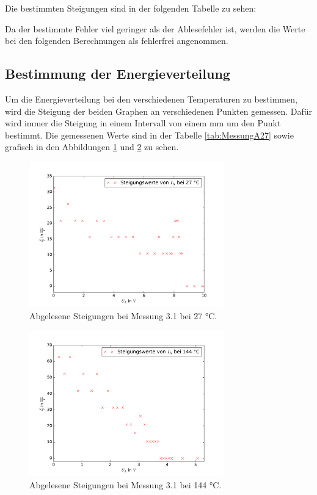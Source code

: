 

Die bestimmten Steigungen sind in der folgenden Tabelle zu sehen:



Da der bestimmte Fehler viel geringer als der Ablesefehler ist, werden die Werte
bei den folgenden Berechnungen als fehlerfrei angenommen.


\subsection{Bestimmung der Energieverteilung}

Um die Energieverteilung bei den verschiedenen Temperaturen zu bestimmen, wird
die Steigung der beiden Graphen an verschiedenen Punkten gemessen. Dafür wird immer
die Steigung in einem Intervall von einem mm um den Punkt bestimmt. Die gemessenen
Werte sind in der Tabelle \ref{tab:MessungA27} sowie grafisch in den Abbildungen
\ref{fig:Messung_A_27} und \ref{fig:Messung_A_144} zu sehen.



\begin{figure}
  \centering
  \includegraphics[width = 0.75\textwidth]{Pics/Messung_A_27.pdf}
  \caption{Abgelesene Steigungen bei Messung 3.1 bei 27 °C.}
  \label{fig:Messung_A_27}
\end{figure}

\begin{figure}
  \centering
  \includegraphics[width = 0.75\textwidth]{Pics/Messung_A_144.pdf}
  \caption{Abgelesene Steigungen bei Messung 3.1 bei 144 °C.}
  \label{fig:Messung_A_144}
\end{figure}

